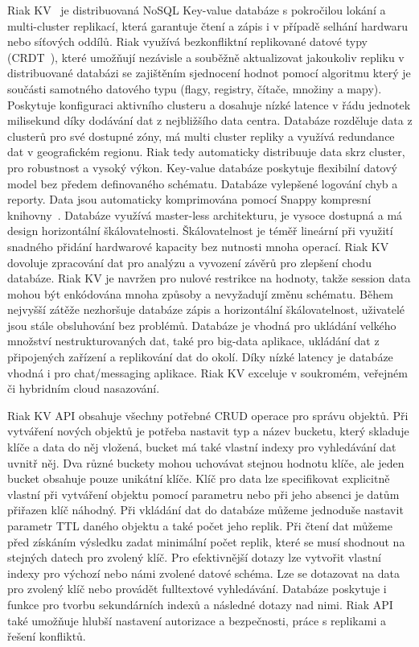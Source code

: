 \documentclass[czech,master,dept460,male,csharp,cpdeclaration]{diploma}
\begin{document}
	Riak KV~\cite{riak} je distribuovaná NoSQL Key-value databáze s pokročilou lokání a multi-cluster replikací, která garantuje čtení a zápis i v případě selhání hardwaru nebo síťových oddílů. Riak využívá bezkonfliktní replikované datové typy (CRDT~\cite{crdt}), které umožňují nezávisle a souběžně aktualizovat jakoukoliv repliku v distribuované databázi se zajištěním sjednocení hodnot pomocí algoritmu který je součásti samotného datového typu (flagy, registry, čítače, množiny a mapy). Poskytuje konfiguraci aktivního clusteru a dosahuje nízké latence v řádu jednotek milisekund díky dodávání dat z nejbližšího data centra. Databáze rozděluje data z clusterů pro své dostupné zóny, má multi cluster repliky a využívá redundance dat v geografickém regionu. Riak tedy automaticky distribuuje data skrz cluster, pro robustnost a vysoký výkon. Key-value databáze poskytuje flexibilní datový model bez předem definovaného schématu. Databáze vylepšené logování chyb a reporty. Data jsou automaticky komprimována pomocí Snappy kompresní knihovny~\cite{snappy}. Databáze využívá master-less architekturu, je vysoce dostupná a má design horizontální škálovatelnosti. Škálovatelnost je téměř lineární při využití snadného přidání hardwarové kapacity bez nutnosti mnoha operací. Riak KV dovoluje zpracování dat pro analýzu a vyvození závěrů pro zlepšení chodu databáze. Riak KV je navržen pro nulové restrikce na hodnoty, takže session data mohou být enkódována mnoha způsoby a nevyžadují změnu schématu. Během nejvyšší zátěže nezhoršuje databáze zápis a horizontální škálovatelnost, uživatelé jsou stále obsluhování bez problémů. Databáze je vhodná pro ukládání velkého množství nestrukturovaných dat, také pro big-data aplikace, ukládání dat z připojených zařízení a replikování dat do okolí. Díky nízké latency je databáze vhodná i pro chat/messaging aplikace. Riak KV exceluje v soukromém, veřejném či hybridním cloud nasazování.
	
	Riak KV API obsahuje všechny potřebné CRUD operace pro správu objektů. Při vytváření nových objektů je potřeba nastavit typ a název bucketu, který skladuje klíče a data do něj vložená, bucket má také vlastní indexy pro vyhledávání dat uvnitř něj. Dva různé buckety mohou uchovávat stejnou hodnotu klíče, ale jeden bucket obsahuje pouze unikátní klíče. Klíč pro data lze specifikovat explicitně vlastní při vytváření objektu pomocí parametru nebo při jeho absenci je datům přiřazen klíč náhodný. Při vkládání dat do databáze můžeme jednoduše nastavit parametr TTL daného objektu a také počet jeho replik. Při čtení dat můžeme před získáním výsledku zadat minimální počet replik, které se musí shodnout na stejných datech pro zvolený klíč. Pro efektivnější dotazy lze vytvořit vlastní indexy pro výchozí nebo námi zvolené datové schéma. Lze se dotazovat na data pro zvolený klíč nebo provádět fulltextové vyhledávání. Databáze poskytuje i funkce pro tvorbu sekundárních indexů a následné dotazy nad nimi. Riak API také umožňuje hlubší nastavení autorizace a bezpečnosti, práce s replikami a řešení konfliktů.
	
\end{document}
